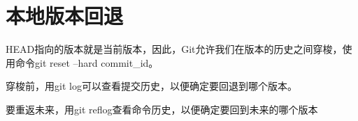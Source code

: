 \chapter{本地版本回退}
HEAD指向的版本就是当前版本，因此，Git允许我们在版本的历史之间穿梭，使用命令git reset --hard commit_id。

穿梭前，用git log可以查看提交历史，以便确定要回退到哪个版本。

要重返未来，用git reflog查看命令历史，以便确定要回到未来的哪个版本